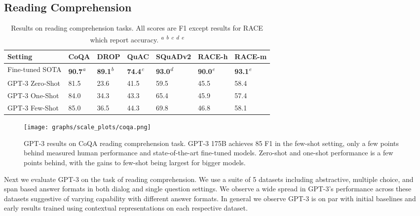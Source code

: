 \documentclass{article}
\begin{document}
    \subsection{Reading Comprehension}
    \label{section:Reading_Comprehension}
    \begin{table}
    \centering
    \begin{center}
        \begin{tabular}{lllllll}
        \toprule
        Setting & CoQA & DROP & QuAC & SQuADv2 & RACE-h & RACE-m\\ 
        \midrule
        Fine-tuned SOTA  & \textbf{90.7}\textsuperscript{\textit{a}} & \textbf{89.1}\textsuperscript{\textit{b}} & \textbf{74.4}\textsuperscript{\textit{c}} & \textbf{93.0}\textsuperscript{\textit{d}} & \textbf{90.0}\textsuperscript{\textit{e}} & \textbf{93.1}\textsuperscript{\textit{e}} \\ 
        GPT-3 Zero-Shot  & 81.5 & 23.6 & 41.5 & 59.5 & 45.5 & 58.4 \\
        GPT-3 One-Shot & 84.0 & 34.3 & 43.3 & 65.4 & 45.9 & 57.4 \\
        GPT-3 Few-Shot  & 85.0 & 36.5 & 44.3 & 69.8 & 46.8 & 58.1 \\
        \bottomrule
        \end{tabular}
        \end{center}
    \caption{Results on reading comprehension tasks. All scores are F1 except results for RACE which report accuracy. \textsuperscript{\textit{a}}\cite{ju2019technical} \textsuperscript{\textit{b}}\cite{dropsota} \textsuperscript{\textit{c}}\cite{quacsota} \textsuperscript{\textit{d}}\cite{squadv2sota} \textsuperscript{\textit{e}}\cite{shoeybi2019megatronlm} }
    \label{table:reading_comprehension}
\end{table} \begin{figure}
\centering\texttt{[image: graphs/scale\_plots/coqa.png]}
\caption{GPT-3 results on CoQA reading comprehension task.  GPT-3 175B achieves 85 F1 in the few-shot setting, only a few points behind measured human performance and state-of-the-art fine-tuned models.  Zero-shot and one-shot performance is a few points behind, with the gains to few-shot being largest for bigger models.}
\label{graph:coqa}
\end{figure} Next we evaluate GPT-3 on the task of reading comprehension. We use a suite of 5 datasets including abstractive, multiple choice, and span based answer formats in both dialog and single question settings. We observe a wide spread in GPT-3's performance across these datasets suggestive of varying capability with different answer formats. In general we observe GPT-3 is on par with initial baselines and early results trained using contextual representations on each respective dataset.
\end{document}

